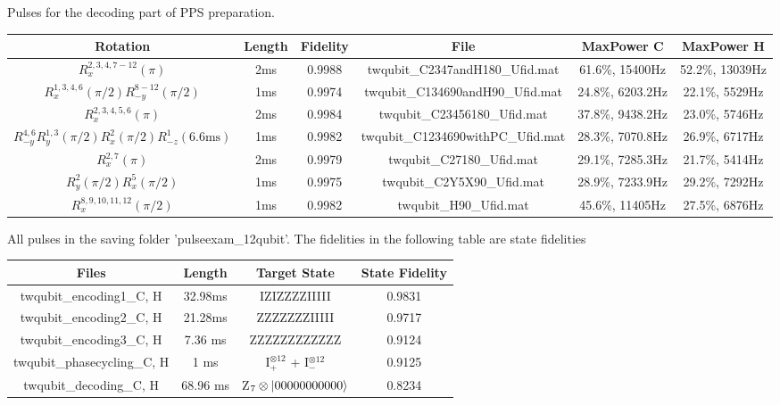 Pulses for the decoding part of PPS preparation.
\begin{table}[!h]
\begin{tabular} {c||c|c|c|c|c}
  \hline
  Rotation & Length & Fidelity & File & MaxPower C & MaxPower H\\
  \hline
  $R_x^{2,3,4,7-12}(\pi)$ & 2ms & 0.9988 & twqubit\_C2347andH180\_Ufid.mat & 61.6\%, 15400Hz & 52.2\%, 13039Hz\\
  $R_x^{1,3,4,6}(\pi/2)R_{-y}^{8-12}(\pi/2)$ & 1ms & 0.9974 & twqubit\_C134690andH90\_Ufid.mat & 24.8\%, 6203.2Hz & 22.1\%, 5529Hz\\
  $R_x^{2,3,4,5,6}(\pi)$ & 2ms & 0.9984 & twqubit\_C23456180\_Ufid.mat & 37.8\%, 9438.2Hz & 23.0\%, 5746Hz\\
  $R_{-y}^{4,6}R_{y}^{1,3}(\pi/2)R_{x}^{2}(\pi/2)R_{-z}^{1}(6.6\text{ms})$ & 1ms & 0.9982 &  twqubit\_C1234690withPC\_Ufid.mat & 28.3\%, 7070.8Hz & 26.9\%, 6717Hz\\
  $R_x^{2,7}(\pi)$ & 2ms & 0.9979 & twqubit\_C27180\_Ufid.mat & 29.1\%, 7285.3Hz & 21.7\%, 5414Hz\\
  $R_{y}^{2}(\pi/2)R_{x}^{5}(\pi/2)$ & 1ms & 0.9975 & twqubit\_C2Y5X90\_Ufid.mat & 28.9\%, 7233.9Hz & 29.2\%, 7292Hz\\
  $R_{x}^{8,9,10,11,12}(\pi/2)$ & 1ms & 0.9982 & twqubit\_H90\_Ufid.mat & 45.6\%, 11405Hz & 27.5\%, 6876Hz\\
  \hline
\end{tabular}
\end{table}

\newpage
All pulses in the saving folder '\dir pulseexam\_12qubit\dir'. The fidelities in the following table are state fidelities
\begin{table}[!h]
\begin{tabular} {c||c|c|c}
  \hline
  Files & Length & Target State & State Fidelity\\
  \hline
  twqubit\_encoding1\_C, H & 32.98ms & IZIZZZZIIIII & 0.9831\\
  twqubit\_encoding2\_C, H & 21.28ms & ZZZZZZZIIIII & 0.9717\\
  twqubit\_encoding3\_C, H & 7.36 ms & ZZZZZZZZZZZZ & 0.9124\\
  twqubit\_phasecycling\_C, H & 1 ms & I$_{+}^{\otimes 12}$ + I$_{-}^{\otimes 12}$ & 0.9125\\
  twqubit\_decoding\_C, H & 68.96 ms & Z$_7\otimes|00000000000\rangle$ & 0.8234\\
  \hline
\end{tabular}
\end{table}

